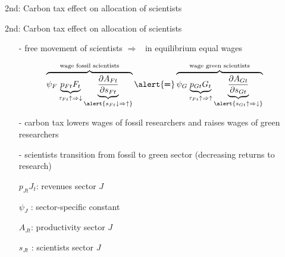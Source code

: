 \documentclass[11pt,aspectratio=169]{beamer}
\newcommand{\ar}{$\Rightarrow$ \ }
\begin{document}
\begin{frame}{2nd: Carbon tax effect on \alert{allocation of scientists}}
\end{frame}

\addtocounter{framenumber}{-1}

\begin{frame}{2nd: Carbon tax effect on \alert{allocation of scientists}}
		\begin{itemize}
		\item[-] free movement of scientists \ar in equilibrium equal wages
	\end{itemize}
	\vspace{0mm}
	\large
	\begin{align*}
		\overbrace{{\psi_F} \underbrace{p_{Ft}{F_t}}_{\tau_{Ft}\uparrow\Rightarrow\downarrow}\underbrace{\frac{\partial A_{Ft}}{\partial s_{Ft}}}_{\alert{{s_{Ft}\downarrow\Rightarrow\uparrow}}}}^{\text{wage fossil scientists}}\alert{\pmb{=}}\overbrace{{\psi_G} \underbrace{p_{Gt}{G_t}}_{\tau_{Ft}\uparrow\Rightarrow\uparrow}\underbrace{\frac{\partial A_{Gt}}{\partial s_{Gt}}}_{\alert{{s_{Gt}\uparrow\Rightarrow\downarrow}}}}^{\text{wage green scientists}}
	\end{align*}
	\normalsize
	\vspace{-2mm}
	\begin{itemize}
		\item[-] carbon tax lowers wages of fossil researchers and raises wages of green researchers
		\vspace{1mm}
		\item[-] scientists transition from fossil to green sector \small{(decreasing returns to research)}
	\end{itemize}
	\small
	\vspace{4mm}
	\hspace{-2mm}
	\begin{minipage}[t!]{0.4\textwidth}
		\vspace{0mm}
		\begin{itemize}
			\item[] $p_{Jt}J_t$: revenues sector $J$
			\vspace{-2mm}
			\item[] $\psi_J$ : sector-specific constant
		\end{itemize}
	\end{minipage}
	\vspace{-5mm}
	\begin{minipage}[t!]{0.5\textwidth}
		\vspace{0mm}
		\begin{itemize}	
			\item[] $A_{Jt}$: productivity sector $J$
			\vspace{-2mm}			
			\item[] $s_{Jt}$ : scientists sector $J$
		\end{itemize}
	\end{minipage}
	
\end{frame}
\end{document}
